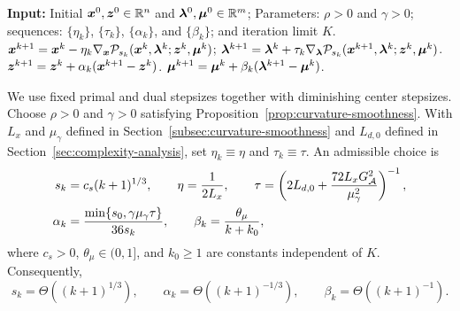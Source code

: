 \begin{algorithm}[t]
    \caption{Smoothed-Perturbed Linearized Augmented Lagrangian Method (SPLALM)}
    \label{alg:ddlalm}
    \small
    \begin{algorithmic}[1]
        \STATE \textbf{Input:} Initial
        \(\bm{x}^0,\bm{z}^0\in\mathbb{R}^n\) and
        \(\bm{\lambda}^0,\bm{\mu}^0\in\mathbb{R}^m\); 
        Parameters: \(\rho>0\) and \(\gamma>0\);
        sequences: \(\{\eta_k\}\), \(\{\tau_k\}\), \(\{\alpha_k\}\), and
        \(\{\beta_k\}\);
        and iteration limit \(K\).
            \STATE  \(\bm{x}^{k+1}=\bm{x}^k- \eta_k \nabla_{\bm{x}} \mathcal P_{s_k}(\bm{x}^{k},\bm{\lambda}^{k};\bm{z}^{k},\bm{\mu}^{k})\);
            \STATE  \(\bm{\lambda}^{k+1}=\bm{\lambda}^k+\tau_k
            \nabla_{\bm{\lambda}}\mathcal P_{s_k}
            (\bm{x}^{k+1},\bm{\lambda}^{k};\bm{z}^{k},\bm{\mu}^{k})\).
            \STATE 
            \(\bm{z}^{k+1}=\bm{z}^k+ \alpha_k(\bm{x}^{k+1}-\bm{z}^k)\).
            \STATE  \(\bm{\mu}^{k+1}=\bm{\mu}^k+ \beta_k(\bm{\lambda}^{k+1}-\bm{\mu}^k)\).
        \ENDFOR
    \end{algorithmic}
\end{algorithm}

We use fixed primal and dual stepsizes together with diminishing center
stepsizes. Choose \(\rho>0\) and \(\gamma>0\) satisfying
Proposition~\ref{prop:curvature-smoothness}. With \(L_x\) and
\(\mu_\gamma\) defined in Section~\ref{subsec:curvature-smoothness} and
\(L_{d,0}\) defined in Section~\ref{sec:complexity-analysis}, set \(\eta_k\equiv\eta\) and
\(\tau_k\equiv\tau\). An admissible choice is
\begin{equation}\label{eq:ddlalm-parameter-schedule}
\begin{aligned}
    s_k &= c_s(k+1)^{1/3},
    \qquad
    \eta = \frac{1}{2L_x},
    \qquad
    \tau =
    \left(
        2L_{d,0}
        +\frac{72L_xG_{\cal A}^2}{\mu_\gamma^2}
    \right)^{-1},
    \\
    \alpha_k &=
    \frac{\min\{s_0,\gamma\mu_\gamma\tau\}}{36s_k},
    \qquad
    \beta_k=\frac{\theta_\mu}{k+k_0},
\end{aligned}
\end{equation}
where \(c_s>0\), \(\theta_\mu\in(0,1]\), and \(k_0\ge1\) are constants
independent of \(K\). Consequently,
\[
    s_k=\Theta((k+1)^{1/3}),
    \qquad
    \alpha_k=\Theta((k+1)^{-1/3}),
    \qquad
    \beta_k=\Theta((k+1)^{-1}).
\]

